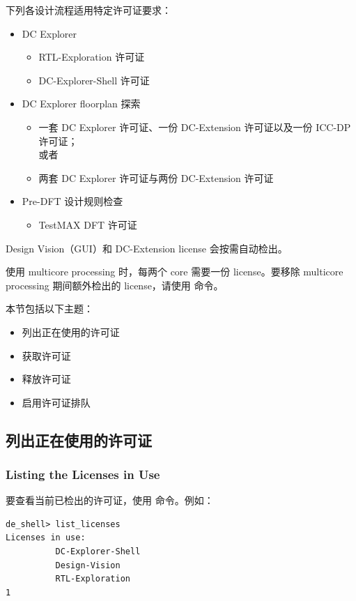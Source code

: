 下列各设计流程适用特定许可证要求：
\begin{itemize}
  \item DC Explorer
  \begin{itemize}
    \item RTL-Exploration 许可证
    \item DC-Explorer-Shell 许可证
  \end{itemize}
  \item DC Explorer floorplan 探索
  \begin{itemize}
    \item 一套 DC Explorer 许可证、一份 DC-Extension 许可证以及一份 ICC-DP 许可证；\\
          或者
    \item 两套 DC Explorer 许可证与两份 DC-Extension 许可证
  \end{itemize}
  \item Pre-DFT 设计规则检查
  \begin{itemize}
    \item TestMAX DFT 许可证
  \end{itemize}
\end{itemize}

Design Vision（GUI）和 DC-Extension license 会按需自动检出。

\begin{noteBox}
使用 multicore processing 时，每两个 core 需要一份 license。要移除 multicore processing 期间额外检出的 license，请使用  命令。
\end{noteBox}

本节包括以下主题：
\begin{itemize}
  \item 列出正在使用的许可证
  \item 获取许可证
  \item 释放许可证
  \item 启用许可证排队
\end{itemize}

\subsection{列出正在使用的许可证}
\subsubsection*{Listing the Licenses in Use}

要查看当前已检出的许可证，使用  命令。例如：
\begin{lstlisting}
de_shell> list_licenses
Licenses in use:
          DC-Explorer-Shell
          Design-Vision
          RTL-Exploration
1
\end{lstlisting}

